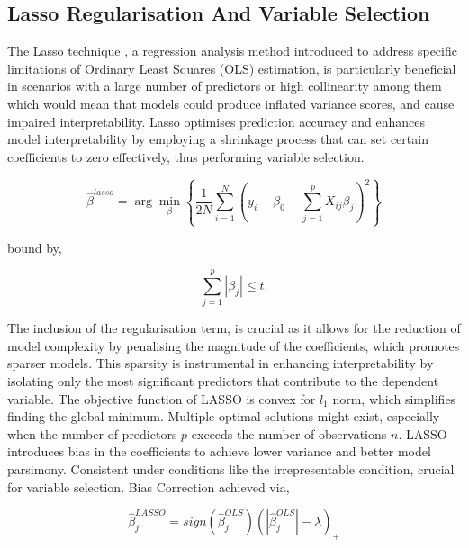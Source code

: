 \subsection{Lasso Regularisation And Variable Selection}
\noindent The Lasso technique \parencite{tibshirani_regression_1996}, a regression analysis method introduced to address specific limitations of Ordinary Least Squares (OLS) estimation, is particularly beneficial in scenarios with a large number of predictors or high collinearity among them which would mean that models could produce inflated variance scores, and cause impaired interpretability. Lasso optimises prediction accuracy and enhances model interpretability by employing a shrinkage process that can set certain coefficients to zero effectively, thus performing variable selection.

\begin{equation} \label{eq:lasso}\hat{\beta}^{lasso} = \arg \min_{\beta} \left\{ \frac{1}{2N} \sum_{i=1}^{N} (y_i - \beta_0 - \sum_{j=1}^{p} X_{ij}\beta_j)^2 \right\}\end{equation}

bound by,

\begin{equation} \label{eq:lassobound}\sum_{j=1}^{p} |\beta_j| \leq t.\end{equation}

\noindent \parencite{freijeirogonzalez_critical_2022} The inclusion of the regularisation term, is crucial as it allows for the reduction of model complexity by penalising the magnitude of the coefficients, which promotes sparser models. This sparsity is instrumental in enhancing interpretability by isolating only the most significant predictors that contribute to the dependent variable. The objective function of LASSO is convex for \(l_{1}\) norm, which simplifies finding the global minimum. Multiple optimal solutions might exist, especially when the number of predictors \(p\) exceeds the number of observations \(n\). \parencite{freijeirogonzalez_critical_2022} LASSO introduces bias in the coefficients to achieve lower variance and better model parsimony. Consistent under conditions like the irrepresentable condition, crucial for variable selection. Bias Correction achieved via,

\begin{equation} \label{eq:lassobais}\hat{\beta}_{j}^{LASSO}=sign(\hat{\beta}_{j}^{OLS})(|\hat{\beta}_{j}^{OLS}| - \lambda)_{+}\end{equation}

